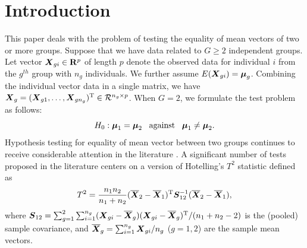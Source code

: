 \documentclass[times,sort&compress,3p]{elsarticle}
\theoremstyle{plain}%
\theoremstyle{definition}
\def\be{\begin{eqnarray}}
\def\ee{\end{eqnarray}}
\def\trans{^{\rm T}}
\newcommand{\uS}       {\mbox{\boldmath$S$}}
\newcommand{\uX}       {\mbox{\boldmath$X$}}
\newcommand{\umu}               {\mbox{\boldmath$\mu$}}
\begin{document}
\section{Introduction} \label{sec:intro}

This paper deals with the problem of testing the equality of mean vectors of two or more groups. Suppose that we have data related to $G \geq 2$ independent groups. Let vector $\uX_{gi} \in \mathbf{R}^{p}$ of length $p$ denote the observed data for individual $i$ from the $g^{th}$ group with $n_{g}$ individuals. We further assume $E(\uX_{gi}) = \umu_g$.  
Combining the individual vector data in a single matrix, we have $\uX_{g} = (\uX_{g1}, \ldots, \uX_{gn_g})\trans \in \mathcal{R}^{n_g \times p}$. When $G=2$, we formulate the test problem as follows:
$$ H_{0}: \umu_1 = \umu_2\;\;\;\mbox{against}\;\;\;  \umu_1 \neq \umu_2.  $$
Hypothesis testing for equality of mean vector between two groups continues to receive considerable attention in the literature \cite{zhang2019more, chen2019two}. A significant number of tests proposed in the literature centers on a version of Hotelling's $T^2$ statistic defined as
\be
T^{2} = \frac{n_1n_2}{n_1 + n_2}(\overline{\uX}_2 - \overline{\uX}_1)\trans\uS^{-1}_{12} (\overline{\uX}_2 - \overline{\uX}_1), \label{eq:eqT2}
\ee
where $\uS_{12} = \sum^{2}_{g=1}\sum^{n_g}_{i=1}(\uX_{gi} - \overline{\uX}_g)(\uX_{gi} - \overline{\uX}_g)\trans /(n_1+n_2 - 2)$ is the (pooled) sample covariance, and $\overline{\uX}_g = \sum^{n_g}_{i=1}\uX_{gi}/n_g$ ($g = 1,2$) are the sample mean vectors.
\end{document}
